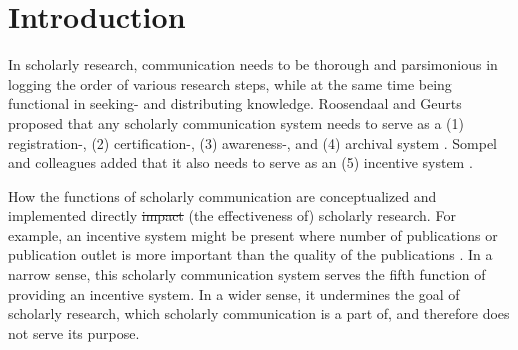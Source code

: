 \documentclass[publications,article,submit,moreauthors,pdftex,10pt,a4paper]{Definitions/mdpi}
\providecommand{\DIFaddtex}[1]{{\protect\color{blue}\uwave{#1}}} %
\providecommand{\DIFdeltex}[1]{{\protect\color{red}\sout{#1}}}                      %
\providecommand{\DIFaddbegin}{} %
\providecommand{\DIFaddend}{} %
\providecommand{\DIFdelbegin}{} %
\providecommand{\DIFdelend}{} %
\providecommand{\DIFadd}[1]{\texorpdfstring{\DIFaddtex{#1}}{#1}} %
\providecommand{\DIFdel}[1]{\texorpdfstring{\DIFdeltex{#1}}{}} %
\newcommand{\DIFscaledelfig}{0.5}
\newlength{\DIFdelgraphicswidth} %
\newlength{\DIFdelgraphicsheight} %
\newcommand{\DIFaddincludegraphics}[2][]{{\color{blue}\fbox{\DIFOincludegraphics[#1]{#2}}}} %
\newcommand{\DIFdelincludegraphics}[2][]{%
\sbox{\DIFdelgraphicsbox}{\DIFOincludegraphics[#1]{#2}}%
\settoboxwidth{\DIFdelgraphicswidth}{\DIFdelgraphicsbox} %
\settoboxtotalheight{\DIFdelgraphicsheight}{\DIFdelgraphicsbox} %
\scalebox{\DIFscaledelfig}{%
\parbox[b]{\DIFdelgraphicswidth}{\usebox{\DIFdelgraphicsbox}\\[-\baselineskip] \rule{\DIFdelgraphicswidth}{0em}}\llap{\resizebox{\DIFdelgraphicswidth}{\DIFdelgraphicsheight}{%
\setlength{\unitlength}{\DIFdelgraphicswidth}%
\begin{picture}(1,1)%
\thicklines\linethickness{2pt} %
{\color[rgb]{1,0,0}\put(0,0){\framebox(1,1){}}}%
{\color[rgb]{1,0,0}\put(0,0){\line( 1,1){1}}}%
{\color[rgb]{1,0,0}\put(0,1){\line(1,-1){1}}}%
\end{picture}%
}\hspace*{3pt}}} %
} %
\DeclareRobustCommand{\DIFaddbegin}{\DIFOaddbegin \let\includegraphics\DIFaddincludegraphics} %
\DeclareRobustCommand{\DIFaddend}{\DIFOaddend \let\includegraphics\DIFOincludegraphics} %
\DeclareRobustCommand{\DIFdelbegin}{\DIFOdelbegin \let\includegraphics\DIFdelincludegraphics} %
\DeclareRobustCommand{\DIFdelend}{\DIFOaddend \let\includegraphics\DIFOincludegraphics} %
\begin{document}

\section*{Introduction}

In scholarly research, communication needs to be thorough and
parsimonious in logging the order of various research steps, while at
the same time being functional in seeking- and distributing knowledge.
Roosendaal and Geurts proposed that any scholarly communication system
needs to serve as a (1) registration-, (2) certification-, (3)
awareness-, and (4) archival system \citep{roosendaal1998}. Sompel
and colleagues added that it also needs to serve as an (5) incentive
system \citep{doi:10.1045/september2004-vandesompel}.

How the functions of scholarly communication are conceptualized and
implemented directly \DIFdelbegin \DIFdel{impact }\DIFdelend \DIFaddbegin \DIFadd{impacts }\DIFaddend (the effectiveness of) scholarly research.
For example, an incentive system might be present where number of
publications or publication outlet is more important than the quality
of the publications \citep{doi:10.3389/fnhum.2018.00037}. In a narrow
sense, this scholarly communication system serves the fifth function
of providing an incentive system. In a wider sense, it undermines the
goal of scholarly research, which scholarly communication is a part
of, and therefore does not serve its purpose.
\end{document}
